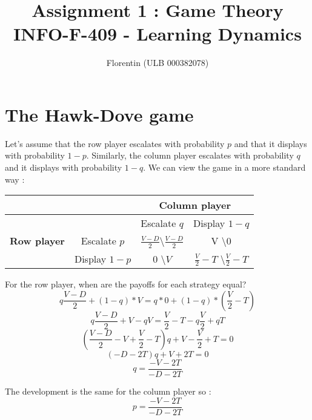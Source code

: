 \documentclass[a4paper]{article}
\title{
    Assignment 1 : Game Theory\\
    \small INFO-F-409 - Learning Dynamics
}
\author{Florentin \bsc{Hennecker} (ULB 000382078)}
\date{}
\begin{document}
\maketitle

\section{The Hawk-Dove game}
Let's assume that the row player escalates with probability $p$ and that it 
displays with probability $1-p$. Similarly, the column player escalates with 
probability $q$ and it displays with probability $1-q$. We can view the game
in a more standard way :

\begin{table}[H]
\begin{tabular}{c|c|c|c}
	& & \multicolumn{2}{c}{\textbf{Column player}} \\
	\hline
	& & Escalate $q$ & Display $1-q$ \\
	\textbf{Row player} & Escalate $p$ & 
		$\frac{V-D}{2}$\textbackslash$\frac{V-D}{2}$ & 
		V \textbackslash $0$\\
	\cline{2-3} & Display $1-p$ & $0$ \textbackslash $V$ &
		$\frac{V}{2}-T$ \textbackslash $\frac{V}{2}-T$\\
\end{tabular}
\end{table}

For the row player, when are the payoffs for each strategy equal?
$$ q\frac{V-D}{2} + (1-q)*V = q*0 + (1-q)*(\frac{V}{2}-T) $$
$$ q\frac{V-D}{2}+V-qV = \frac{V}{2}-T -q\frac{V}{2} + qT $$
$$ (\frac{V-D}{2} - V + \frac{V}{2} - T)q + V - \frac{V}{2} + T = 0 $$
$$ (-D-2T)q + V+2T = 0 $$
$$ q = \frac{-V-2T}{-D-2T} $$

The development is the same for the column player so :
$$ p = \frac{-V-2T}{-D-2T} $$


\end{document}
